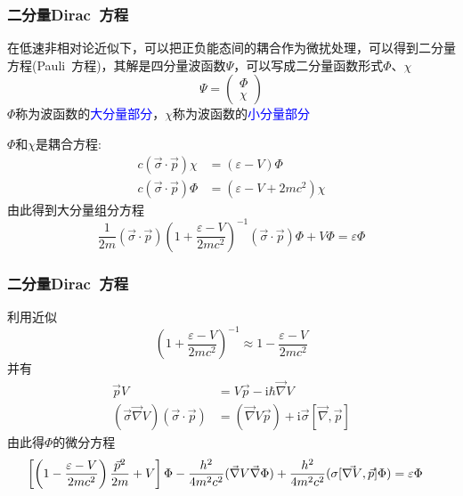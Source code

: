 \documentclass[cjk,slidestop,compress,mathserif,blue]{beamer}
\begin{document}
\frame
{
	\frametitle{二分量\textrm{Dirac~}方程}
	在低速非相对论近似下，可以把正负能态间的耦合作为微扰处理，可以得到二分量方程(\textrm{Pauli~}方程)，其解是四分量波函数$\Psi$，可以写成二分量函数形式$\Phi$、$\chi$
	\begin{displaymath}
		\Psi=\left( 
		\begin{matrix}
			\Phi\\
			\chi
		\end{matrix}
		\right)
	\end{displaymath}
	$\Phi$称为波函数的\textcolor{blue}{大分量部分}，$\chi$称为波函数的\textcolor{blue}{小分量部分}

	$\Phi$和$\chi$是耦合方程:%
	\begin{displaymath}
		\begin{aligned}
			c(\vec{\sigma}\cdot\vec p)\chi&=(\varepsilon-V)\Phi\\
			c(\vec{\sigma}\cdot\vec p)\Phi&=(\varepsilon-V+2mc^2)\chi
		\end{aligned}
	\end{displaymath}
	由此得到大分量组分方程
	\begin{displaymath}
		\frac1{2m}(\vec{\sigma}\cdot\vec p)\left( 1+\frac{\varepsilon-V}{2mc^2} \right)^{-1}(\vec{\sigma}\cdot\vec p)\Phi+V\Phi=\varepsilon\Phi	
	\end{displaymath}
}

\frame
{
	\frametitle{二分量\textrm{Dirac~}方程}
	利用近似$$\left( 1+\frac{\varepsilon-V}{2mc^2} \right)^{-1}\approx1-\frac{\varepsilon-V}{2mc^2}$$
	并有
	\begin{displaymath}
		\begin{aligned}
			\vec pV&=V\vec p-\mathrm{i}\hbar\vec{\nabla}V\\
			(\vec{\sigma}\vec{\nabla}V)(\vec{\sigma}\cdot\vec p)&=(\vec{\nabla}V\vec p)+\mathrm{i}\vec{\sigma}[\vec{\nabla},\vec p]
		\end{aligned}
	\end{displaymath}
	由此得$\Phi$的微分方程
	\begin{displaymath}
		\hspace*{-10pt}	\left[ \left( 1-\frac{\varepsilon-V}{2mc^2} \right)\frac{\vec p^2}{2m}+V \right]\Phi-\frac{h^2}{4m^2c^2}(\vec{\nabla}V\vec{\nabla}\Phi)+\frac{h^2}{4m^2c^2}(\sigma[\vec{\nabla V},\vec p]\Phi)=\varepsilon\Phi
	\end{displaymath}
}
\end{document}

